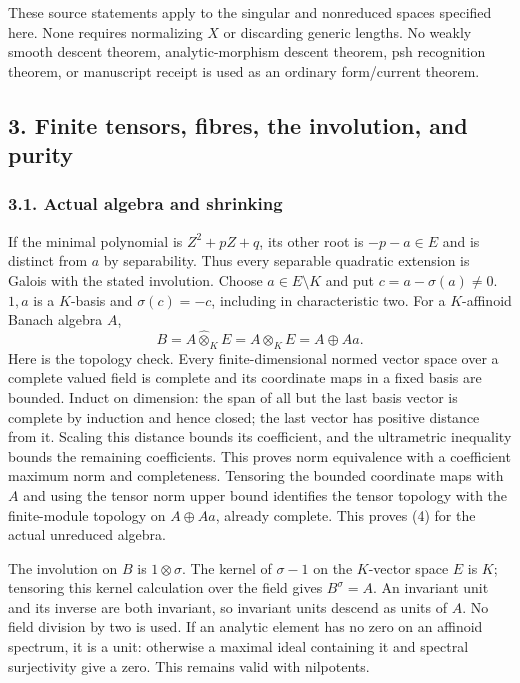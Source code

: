 \documentclass[
  11pt,
]{article}
\begin{document}
These source statements apply to the singular and nonreduced spaces
specified here. None requires normalizing \(X\) or discarding generic
lengths. No weakly smooth descent theorem, analytic-morphism descent
theorem, psh recognition theorem, or manuscript receipt is used as an
ordinary form/current theorem.

\subsection{3. Finite tensors, fibres, the involution, and
purity}\label{finite-tensors-fibres-the-involution-and-purity}

\subsubsection{3.1. Actual algebra and
shrinking}\label{actual-algebra-and-shrinking}

If the minimal polynomial is \(Z^2+pZ+q\), its other root is
\(-p-a\in E\) and is distinct from \(a\) by separability. Thus every
separable quadratic extension is Galois with the stated involution.
Choose \(a\in E\setminus K\) and put \(c=a-\sigma(a)\ne0\). \(1,a\) is a
\(K\)-basis and \(\sigma(c)=-c\), including in characteristic two. For a
\(K\)-affinoid Banach algebra \(A\), \[
 B=A\widehat\otimes_K E=A\otimes_K E=A\oplus Aa.             \tag{4}
\] Here is the topology check. Every finite-dimensional normed vector
space over a complete valued field is complete and its coordinate maps
in a fixed basis are bounded. Induct on dimension: the span of all but
the last basis vector is complete by induction and hence closed; the
last vector has positive distance from it. Scaling this distance bounds
its coefficient, and the ultrametric inequality bounds the remaining
coefficients. This proves norm equivalence with a coefficient maximum
norm and completeness. Tensoring the bounded coordinate maps with \(A\)
and using the tensor norm upper bound identifies the tensor topology
with the finite-module topology on \(A\oplus Aa\), already complete.
This proves (4) for the actual unreduced algebra.

The involution on \(B\) is \(1\otimes\sigma\). The kernel of
\(\sigma-1\) on the \(K\)-vector space \(E\) is \(K\); tensoring this
kernel calculation over the field gives \(B^\sigma=A\). An invariant
unit and its inverse are both invariant, so invariant units descend as
units of \(A\). No field division by two is used. If an analytic element
has no zero on an affinoid spectrum, it is a unit: otherwise a maximal
ideal containing it and spectral surjectivity give a zero. This remains
valid with nilpotents.
\end{document}
